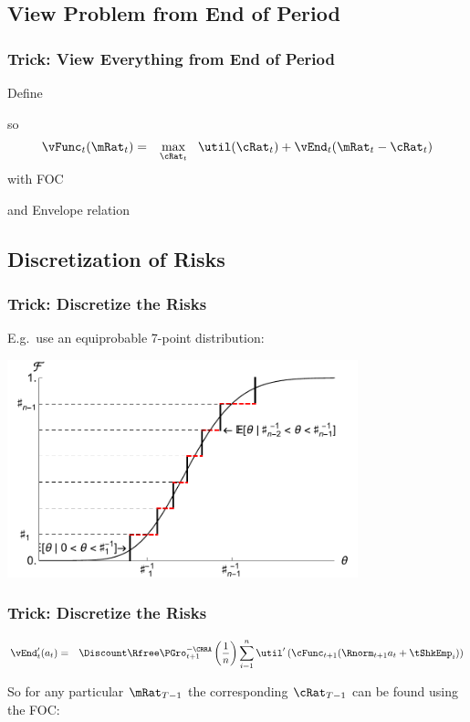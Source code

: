\documentclass{beamer}
\begin{document}
\subsection{View Problem from End of Period}

\begin{frame}[label=Normalize]
\frametitle{Trick: View Everything from End of Period}

Define 

so 
\begin{eqnarray}
  \vFunc_{t}(\mRat_{t}) & = & \max_{\cRat_{t}}~~ \util(\cRat_{t}) + \vEnd_{t}(\mRat_{t}-\cRat_{t})
\end{eqnarray}
with FOC

and Envelope relation


\end{frame}

\subsection{Discretization of Risks}
\begin{frame}[label=DiscretizeFig]
\frametitle{Trick: Discretize the Risks}

E.g.\ use an equiprobable 7-point distribution:\medskip\medskip

\includegraphics[width=4in]{./Figures/discreteApprox.pdf}

\end{frame}

\begin{frame}[label=DiscretizeEqn]
\frametitle{Trick: Discretize the Risks}

\begin{eqnarray}
        \vEnd_{t}^{\prime}({a}_{t}) & = &  \Discount \Rfree \PGro_{t+1}^{-\CRRA} \left(\frac{1}{n}\right) \sum_{i=1}^{n} \util^{\prime}\left(\cFunc_{t+1}(\Rnorm_{t+1} {a}_{t} + \tShkEmp_{i})\right)
\end{eqnarray}

%

\pause 
So for any particular $\mRat_{T-1}$ the corresponding $\cRat_{T-1}$ can be found
using the FOC:


\end{frame}
\end{document}
